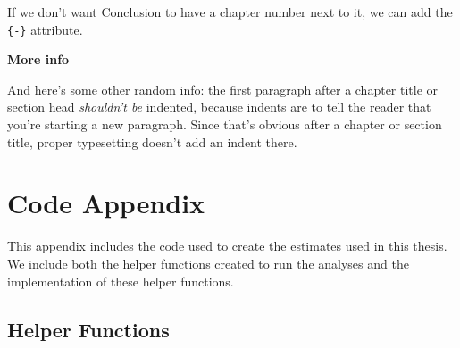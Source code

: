 \documentclass[12pt,twoside]{reedthesis}
\begin{document}
If we don't want Conclusion to have a chapter number next to it, we can add the \texttt{\{-\}} attribute.

\textbf{More info}

And here's some other random info: the first paragraph after a chapter title or section head \emph{shouldn't be} indented, because indents are to tell the reader that you're starting a new paragraph. Since that's obvious after a chapter or section title, proper typesetting doesn't add an indent there.

\appendix

\hypertarget{code-appendix}{%
\chapter{Code Appendix}\label{code-appendix}}

This appendix includes the code used to create the estimates used in this thesis. We include both the helper functions created to run the analyses and the implementation of these helper functions.

\hypertarget{helper-functions}{%
\section{Helper Functions}\label{helper-functions}}
\end{document}
